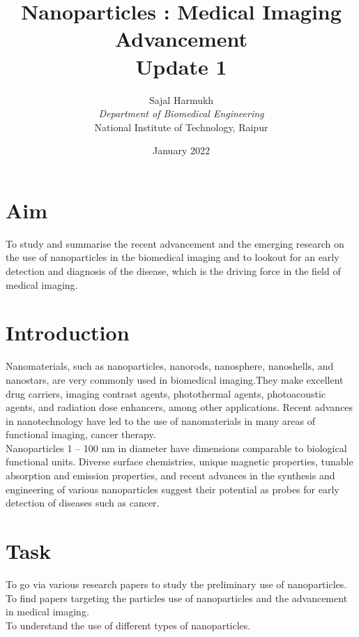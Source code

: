 \documentclass{article}
\title{\textbf{Nanoparticles : Medical Imaging Advancement\\Update 1}}
\author{Sajal Harmukh \\ \textit{Department of Biomedical Engineering} \\ National Institute of Technology, Raipur }
\date{January 2022}
\begin{document}
\maketitle

\section*{Aim}
To study and summarise the recent advancement and the emerging research on the use of nanoparticles in the biomedical imaging and to lookout for an early detection and diagnosis of the disease, which is the driving force in the field of medical imaging.

\section*{Introduction}
Nanomaterials, such as nanoparticles, nanorods, nanosphere, nanoshells, and nanostars, are
very commonly used in biomedical imaging.They make excellent drug carriers, imaging contrast agents, photothermal agents, photoacoustic agents, and radiation dose enhancers, among other applications. Recent advances in nanotechnology have led to the use of nanomaterials
in many areas of functional imaging, cancer therapy.\\ Nanoparticles 1 – 100 nm in diameter have dimensions comparable to biological functional units. Diverse surface chemistries, unique magnetic properties, tunable absorption and emission properties, and recent advances in the synthesis and engineering of various nanoparticles suggest their potential as probes for early detection of diseases such as cancer.
 
\section*{Task}
To go via various research papers to study the preliminary use of nanoparticles.
\\ To find papers targeting the particles use of nanoparticles and the advancement in medical imaging.
\\ To understand the use of different types of nanoparticles.

 
  
\end{document}
